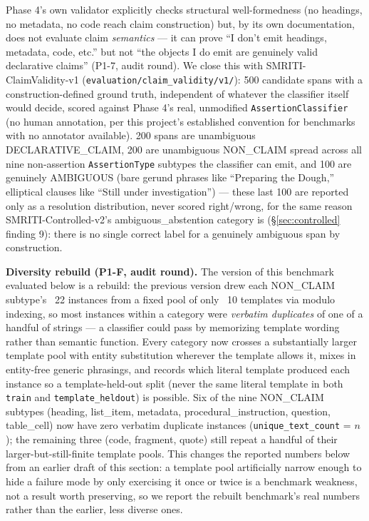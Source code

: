 

Phase 4's own validator explicitly checks structural well-formedness
(no headings, no metadata, no code reach claim construction) but, by its
own documentation, does not evaluate claim \emph{semantics} --- it can
prove ``I don't emit headings, metadata, code, etc.'' but not ``the
objects I do emit are genuinely valid declarative claims'' (P1-7, audit
round). We close this with SMRITI-ClaimValidity-v1
(\texttt{evaluation/claim\_validity/v1/}): 500 candidate spans with a
construction-defined ground truth, independent of whatever the
classifier itself would decide, scored against Phase 4's real,
unmodified \texttt{AssertionClassifier} (no human annotation, per this
project's established convention for benchmarks with no annotator
available). 200 spans are unambiguous DECLARATIVE\_CLAIM, 200 are
unambiguous NON\_CLAIM spread across all nine non-assertion
\texttt{AssertionType} subtypes the classifier can emit, and 100 are
genuinely AMBIGUOUS (bare gerund phrases like ``Preparing the Dough,''
elliptical clauses like ``Still under investigation'') --- these last
100 are reported only as a resolution distribution, never scored
right/wrong, for the same reason SMRITI-Controlled-v2's
ambiguous\_abstention category is (\S\ref{sec:controlled} finding 9):
there is no single correct label for a genuinely ambiguous span by
construction.

\textbf{Diversity rebuild (P1-F, audit round).} The version of this
benchmark evaluated below is a rebuild: the previous version drew each
NON\_CLAIM subtype's ~22 instances from a fixed pool of only ~10
templates via modulo indexing, so most instances within a category were
\emph{verbatim duplicates} of one of a handful of strings --- a
classifier could pass by memorizing template wording rather than
semantic function. Every category now crosses a substantially larger
template pool with entity substitution wherever the template allows it,
mixes in entity-free generic phrasings, and records which literal
template produced each instance so a template-held-out split (never the
same literal template in both \texttt{train} and
\texttt{template\_heldout}) is possible. Six of the nine NON\_CLAIM
subtypes (heading, list\_item, metadata, procedural\_instruction,
question, table\_cell) now have zero verbatim duplicate instances
(\texttt{unique\_text\_count} = $n$); the remaining three (code,
fragment, quote) still repeat a handful of their larger-but-still-finite
template pools. This changes the reported numbers below from an earlier
draft of this section: a template pool artificially narrow enough to
hide a failure mode by only exercising it once or twice is a benchmark
weakness, not a result worth preserving, so we report the rebuilt
benchmark's real numbers rather than the earlier, less diverse ones.

